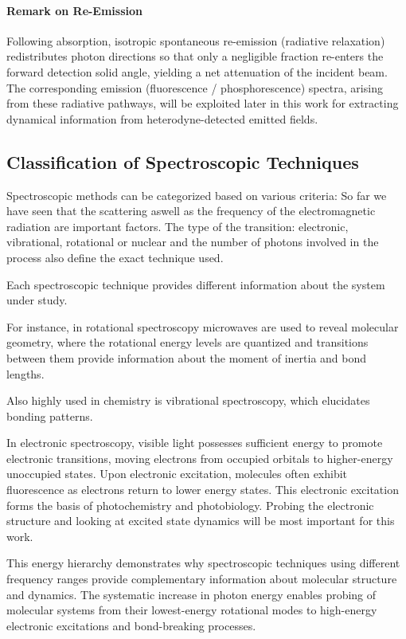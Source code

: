 \paragraph{Remark on Re-Emission}
\noindent Following absorption, isotropic spontaneous re-emission (radiative relaxation) redistributes photon directions so that only a negligible fraction re-enters the forward detection solid angle, yielding a net attenuation of the incident beam. The corresponding emission (fluorescence / phosphorescence) spectra, arising from these radiative pathways, will be exploited later in this work for extracting dynamical information from heterodyne-detected emitted fields.

\subsection{Classification of Spectroscopic Techniques}
\label{subsec:spectroscopy_classification}

\noindent Spectroscopic methods can be categorized based on various criteria:
So far we have seen that the scattering aswell as the frequency of the electromagnetic radiation are important factors. The type of the transition: electronic, vibrational, rotational or nuclear and the number of photons involved in the process also define the exact technique used.

\noindent Each spectroscopic technique provides different information about the system under study.

For instance, in rotational spectroscopy microwaves are used to reveal molecular geometry, where the rotational energy levels are quantized and transitions between them provide information about the moment of inertia and bond lengths.

Also highly used in chemistry is vibrational spectroscopy, which elucidates bonding patterns.

In electronic spectroscopy, visible light possesses sufficient energy to promote electronic transitions, moving electrons from occupied orbitals to higher-energy unoccupied states. Upon electronic excitation, molecules often exhibit fluorescence as electrons return to lower energy states. This electronic excitation forms the basis of photochemistry and photobiology.
Probing the electronic structure and looking at excited state dynamics will be most important for this work.

\noindent This energy hierarchy demonstrates why spectroscopic techniques using different frequency ranges provide complementary information about molecular structure and dynamics. The systematic increase in photon energy enables probing of molecular systems from their lowest-energy rotational modes to high-energy electronic excitations and bond-breaking processes.

